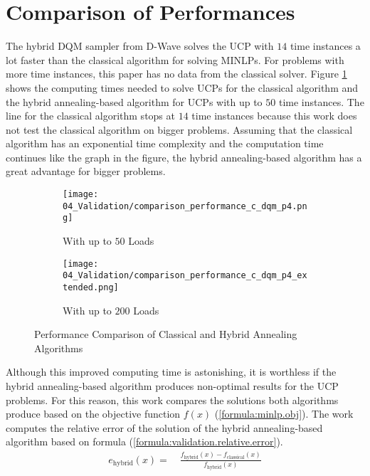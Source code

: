 \section{Comparison of Performances}
\label{evaluation:comparison}

The hybrid DQM sampler from D-Wave solves the UCP with $14$ time instances a lot faster than the classical algorithm for solving MINLPs.
For problems with more time instances, this paper has no data from the classical solver.
Figure \ref{figure:evaluation.comparison.performance} shows the computing times needed to solve UCPs for the classical algorithm and the hybrid annealing-based algorithm for UCPs with up to $50$ time instances.
The line for the classical algorithm stops at $14$ time instances because this work does not test the classical algorithm on bigger problems.
Assuming that the classical algorithm has an exponential time complexity and the computation time continues like the graph in the figure, the hybrid annealing-based algorithm has a great advantage for bigger problems.

\begin{figure}
  \begin{subfigure}[b]{0.5 \textwidth}
    \centering
    \texttt{[image: 04\_Validation/comparison\_performance\_c\_dqm\_p4.png]}
    \caption{With up to $50$ Loads}
    \label{figure:evaluation.comparison.performance}
  \end{subfigure}
  \begin{subfigure}[b]{0.5 \textwidth}
    \centering
    \texttt{[image: 04\_Validation/comparison\_performance\_c\_dqm\_p4\_extended.png]}
    \caption{With up to $200$ Loads}
    \label{figure:evaluation.comparison.performance.extended}
  \end{subfigure}
  \caption{Performance Comparison of Classical and Hybrid Annealing Algorithms}
\end{figure}

Although this improved computing time is astonishing, it is worthless if the hybrid annealing-based algorithm produces non-optimal results for the UCP problems.
For this reason, this work compares the solutions both algorithms produce based on the objective function $f(x)$ (\ref{formula:minlp.obj}).
The work computes the relative error of the solution of the hybrid annealing-based algorithm based on formula (\ref{formula:validation.relative.error}).
\begin{align}
  \label{formula:validation.relative.error}
  e_{\text{hybrid}}(x) = \quad \frac{f_{\text{hybrid}}(x) - f_{\text{classical}}(x)}{f_{\text{hybrid}}(x)}
\end{align}

